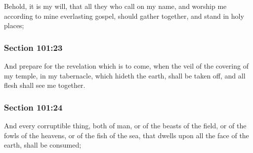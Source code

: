		Behold, it is my will, that all they who call on my name, and worship me according to mine everlasting gospel, should gather together, and stand in holy places;


	\subsubsection{Section 101:23} %
		\label{DC101-23}

		And prepare for the revelation which is to come, when the veil of the covering of my temple, in my tabernacle, which hideth the earth, shall be taken off, and all flesh shall see me together.


	\subsubsection{Section 101:24} %
		\label{DC101-24}

		And every corruptible thing, both of man, or of the beasts of the field, or of the fowls of the heavens, or of the fish of the sea, that dwells upon all the face of the earth, shall be consumed;



